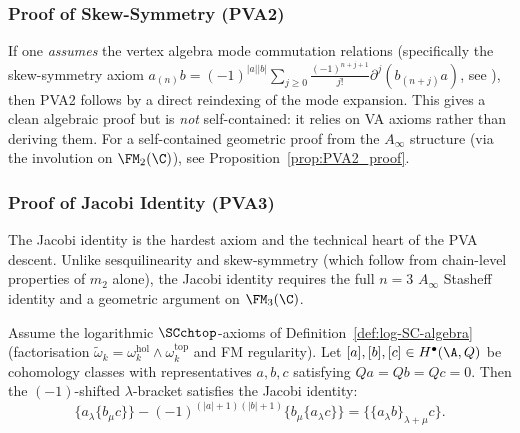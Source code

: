 \subsubsection{Proof of Skew-Symmetry (PVA2)}

\begin{remark}
If one \emph{assumes} the vertex algebra mode commutation relations
(specifically the skew-symmetry axiom $a_{(n)} b = (-1)^{|a||b|}
\sum_{j \geq 0} \frac{(-1)^{n+j+1}}{j!} \partial^j(b_{(n+j)} a)$, see
\cite[Theorem~3.3.2]{Kac98}), then PVA2 follows by a direct reindexing
of the mode expansion. This gives a clean algebraic proof but is
\emph{not} self-contained: it relies on VA axioms rather than deriving
them. For a self-contained geometric proof from the $A_\infty$ structure
(via the involution on $\FM_2(\C)$), see Proposition~\ref{prop:PVA2_proof}.
\end{remark}

\subsubsection{Proof of Jacobi Identity (PVA3)}

The Jacobi identity is the hardest axiom and the technical heart of the PVA descent. Unlike sesquilinearity and skew-symmetry (which follow from chain-level properties of $m_2$ alone), the Jacobi identity requires the full $n=3$ $A_\infty$ Stasheff identity and a geometric argument on $\FM_3(\C)$.

\begin{lemma}
Assume the logarithmic $\SCchtop$-axioms of
Definition~\ref{def:log-SC-algebra} (factorisation
$\widetilde\omega_k = \omega_k^{\mathrm{hol}} \wedge \omega_k^{\mathrm{top}}$
and FM regularity). Let $[a],[b],[c]\in H^\bullet(\A,Q)$ be cohomology classes with representatives $a,b,c$ satisfying $Qa=Qb=Qc=0$. Then the $(-1)$-shifted $\lambda$-bracket satisfies the Jacobi identity:
\begin{equation}
\{a_\lambda \{b_\mu c\}\} - (-1)^{(|a|+1)(|b|+1)} \{b_\mu \{a_\lambda c\}\} = \{\{a_\lambda b\}_{\lambda+\mu} c\}.
\end{equation}
\end{lemma}

